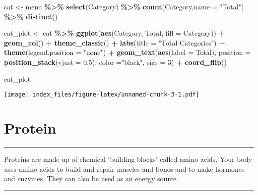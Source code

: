\documentclass[
]{article}
\newenvironment{Shaded}{\begin{snugshade}}{\end{snugshade}}
\newcommand{\AttributeTok}[1]{\textcolor[rgb]{0.13,0.29,0.53}{#1}}
\newcommand{\DecValTok}[1]{\textcolor[rgb]{0.00,0.00,0.81}{#1}}
\newcommand{\FloatTok}[1]{\textcolor[rgb]{0.00,0.00,0.81}{#1}}
\newcommand{\FunctionTok}[1]{\textcolor[rgb]{0.13,0.29,0.53}{\textbf{#1}}}
\newcommand{\NormalTok}[1]{#1}
\newcommand{\OtherTok}[1]{\textcolor[rgb]{0.56,0.35,0.01}{#1}}
\newcommand{\SpecialCharTok}[1]{\textcolor[rgb]{0.81,0.36,0.00}{\textbf{#1}}}
\newcommand{\StringTok}[1]{\textcolor[rgb]{0.31,0.60,0.02}{#1}}
\begin{document}
\begin{Shaded}
\begin{Highlighting}[]
\NormalTok{cat }\OtherTok{\textless{}{-}}\NormalTok{ menu }\SpecialCharTok{\%\textgreater{}\%} 
  \FunctionTok{select}\NormalTok{(Category) }\SpecialCharTok{\%\textgreater{}\%} 
  \FunctionTok{count}\NormalTok{(Category,}\AttributeTok{name =} \StringTok{"Total"}\NormalTok{)  }\SpecialCharTok{\%\textgreater{}\%} 
  \FunctionTok{distinct}\NormalTok{()}

\NormalTok{cat\_plot }\OtherTok{\textless{}{-}}\NormalTok{ cat }\SpecialCharTok{\%\textgreater{}\%} 
  \FunctionTok{ggplot}\NormalTok{(}\FunctionTok{aes}\NormalTok{(Category,}
\NormalTok{             Total,}
             \AttributeTok{fill =}\NormalTok{ Category)) }\SpecialCharTok{+} 
  \FunctionTok{geom\_col}\NormalTok{() }\SpecialCharTok{+} 
  \FunctionTok{theme\_classic}\NormalTok{() }\SpecialCharTok{+} 
  \FunctionTok{labs}\NormalTok{(}\AttributeTok{title =} \StringTok{"Total Categories"}\NormalTok{) }\SpecialCharTok{+} 
  \FunctionTok{theme}\NormalTok{(}\AttributeTok{legend.position =} \StringTok{"none"}\NormalTok{) }\SpecialCharTok{+} 
  \FunctionTok{geom\_text}\NormalTok{(}\FunctionTok{aes}\NormalTok{(}\AttributeTok{label =}\NormalTok{ Total), }
            \AttributeTok{position =} \FunctionTok{position\_stack}\NormalTok{(}\AttributeTok{vjust =} \FloatTok{0.5}\NormalTok{),}
            \AttributeTok{color =}\StringTok{"black"}\NormalTok{, }\AttributeTok{size =} \DecValTok{3}\NormalTok{) }\SpecialCharTok{+} \FunctionTok{coord\_flip}\NormalTok{()}


\NormalTok{cat\_plot}
\end{Highlighting}
\end{Shaded}

\texttt{[image: index\_files/figure-latex/unnamed-chunk-3-1.pdf]}

\hypertarget{protein}{%
\section{Protein}\label{protein}}

\begin{center}\rule{0.5\linewidth}{0.5pt}\end{center}

Proteins are made up of chemical `building blocks' called amino acids.
Your body uses amino acids to build and repair muscles and bones and to
make hormones and enzymes. They can also be used as an energy source.

\begin{center}\rule{0.5\linewidth}{0.5pt}\end{center}
\end{document}
